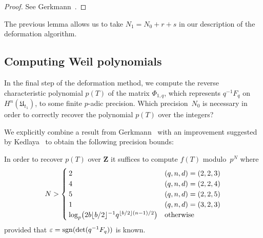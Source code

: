 \begin{proof} 
See Gerkmann~\citep[Lemma~3.3, Lemma~3.4]{Gerkmann2007}.
\end{proof}

The previous lemma allows us to take 
$N_1 = N_0 + r + s$ in our description of the deformation 
algorithm.

\subsection{Computing Weil polynomials}

In the final step of the deformation method, we compute the 
reverse characteristic polynomial $p(T)$ of the matrix $\Phi_{1,q}$, 
which represents $q^{-1} F_q$ on $H^n(\mathfrak{U}_{t_1})$, to some finite 
$p$-adic precision.  Which precision~$N_0$ is necessary in order to 
correctly recover the polynomial $p(T)$ over the integers?

We explicitly combine a result from Gerkmann~\citep[Theorem~3.2]{Gerkmann2007}
with an improvement suggested by Kedlaya~\citep[Lemma~1.2.3]{Kedlaya2011}
to obtain the following precision bounds:

\begin{thm}
In order to recover $p(T)$ over $\mathbf{Z}$ it suffices to compute 
$f(T)$ modulo~$p^N$ where 
\begin{equation*}
N > \begin{cases}
    2 & (q,n,d) = (2,2,3) \\
    4 & (q,n,d) = (2,2,4) \\
    5 & (q,n,d) = (2,2,5) \\
    1 & (q,n,d) = (3,2,3) \\
    \log_p \bigl( 2 b \lfloor b/2\rfloor^{-1} q^{\left\lfloor b/2\right\rfloor (n - 1) / 2} \bigr) & \text{otherwise}
    \end{cases}
\end{equation*}
provided that $\varepsilon = \operatorname{sgn}(\det(q^{-1} F_q))$ is known.
\end{thm}

